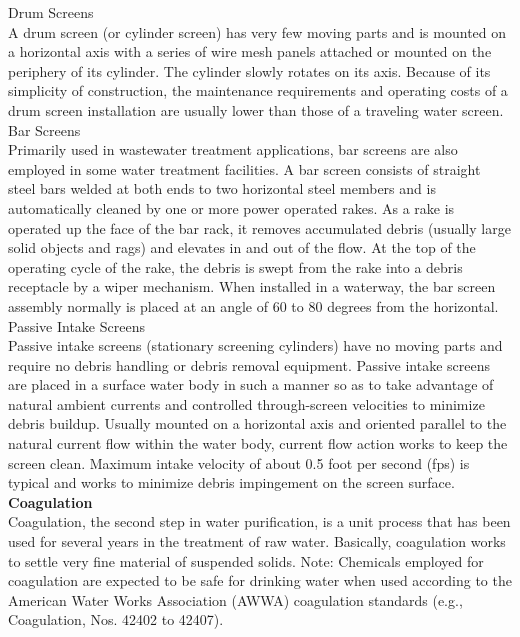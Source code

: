 \documentclass{article}
\begin{document}
Drum Screens\\
A drum screen (or cylinder screen) has very few moving parts and is mounted on a horizontal axis with a series of wire mesh panels attached or mounted on the periphery of its cylinder. The cylinder slowly rotates on its axis. Because of its simplicity of construction, the maintenance requirements and operating costs of a drum screen installation are usually lower than those of a traveling water screen.\\
Bar Screens\\
Primarily used in wastewater treatment applications, bar screens are also employed in some water treatment facilities. A bar screen consists of straight steel bars welded at both ends to two horizontal steel members and is automatically cleaned by one
or more power operated rakes. As a rake is operated up the face of the bar rack, it removes accumulated debris (usually large solid objects and rags) and elevates in and out of the flow. At the top of the operating cycle of the rake, the debris is swept from the rake into a debris receptacle by a wiper mechanism. When installed in a waterway, the bar screen assembly normally is placed at an angle of 60 to 80 degrees from the horizontal.\\
Passive Intake Screens\\
Passive intake screens (stationary screening cylinders) have no moving parts and require no debris handling or debris removal equipment. Passive intake screens are placed in a surface water body in such a manner so as to take advantage of natural ambient currents and controlled through-screen velocities to minimize debris buildup. Usually mounted on a horizontal axis and oriented parallel to the natural current flow within the water body, current flow action works to keep the screen clean. Maximum intake velocity of about 0.5 foot per second (fps) is typical and works to minimize debris impingement on the screen surface.\\


\textbf{Coagulation}\\
Coagulation, the second step in water purification, is a unit process that has been used for several years in the treatment of raw water. Basically, coagulation works to settle very fine material of suspended solids.
Note: Chemicals employed for coagulation are expected to be safe for drinking water when used according to the American Water Works Association (AWWA) coagulation standards (e.g., Coagulation, Nos. 42402 to 42407).\\
\end{document}

